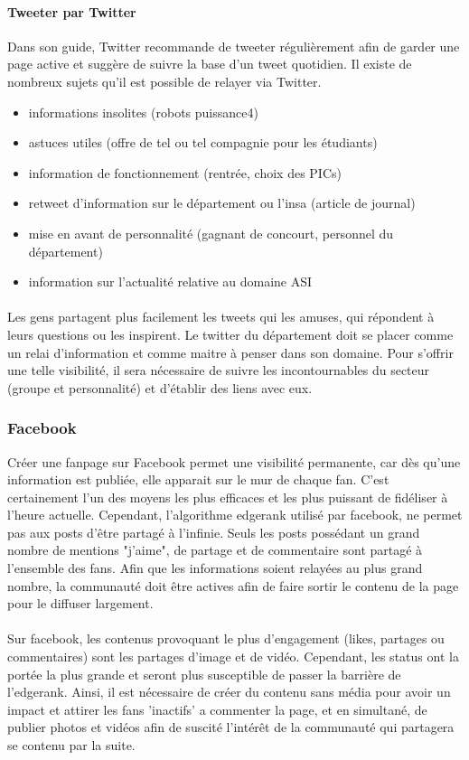 \paragraph{Tweeter par Twitter ~~\\} 
Dans son guide, Twitter recommande de tweeter régulièrement afin de garder une page active et suggère de suivre la base d'un tweet quotidien.
Il existe de nombreux sujets qu'il est possible de relayer via Twitter.
\begin{itemize}
	\item informations insolites (robots puissance4)
	\item astuces utiles (offre de tel ou tel compagnie pour les étudiants)
	\item information de fonctionnement (rentrée, choix des PICs)
	\item retweet d'information sur le département ou l'insa (article de journal)
	\item mise en avant de personnalité (gagnant de concourt, personnel du département)
	\item information sur l'actualité relative au domaine ASI
\end{itemize}
\paragraph{}
 Les gens partagent plus facilement les tweets qui les amuses, qui répondent à leurs questions ou les inspirent. Le twitter du département doit se placer comme un relai d'information et comme maitre à penser dans son domaine. Pour s'offrir une telle visibilité, il sera nécessaire de suivre les incontournables du secteur (groupe et personnalité) et d'établir des liens avec eux.
\subsubsection{Facebook}
Créer une fanpage sur Facebook permet une visibilité permanente, car dès qu'une information est publiée, elle apparait sur le mur de chaque fan. C'est certainement l'un des moyens les plus efficaces et les plus puissant de fidéliser à l'heure actuelle. Cependant, l'algorithme edgerank utilisé par facebook, ne permet pas aux posts d'être partagé à l'infinie. Seuls les posts possédant un grand nombre de mentions "j'aime", de partage et de commentaire sont partagé à l'ensemble des fans. Afin que les informations soient relayées au plus grand nombre, la communauté doit être actives afin de faire sortir le contenu de la page pour le diffuser largement.
\paragraph{}
Sur facebook, les contenus provoquant le plus d'engagement (likes, partages ou commentaires) sont les partages d'image et de vidéo. Cependant, les status ont la portée la plus grande et seront plus susceptible de passer la barrière de l'edgerank. Ainsi, il est nécessaire de créer du contenu sans média pour avoir un impact et attirer les fans 'inactifs' a commenter la page, et en simultané, de publier photos et vidéos afin de suscité l'intérêt de la communauté qui partagera se contenu par la suite.